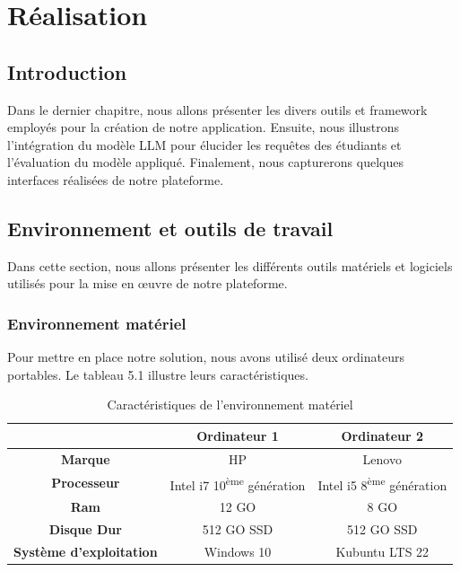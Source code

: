 \vfill 
\chapter{Réalisation}
\label{chap:conception}
\mtcaddchapter
\section*{Introduction}
\justifying
Dans le dernier chapitre, nous allons présenter les divers outils et framework employés pour la création de notre application. Ensuite, nous illustrons l'intégration  du modèle LLM pour élucider les requêtes des étudiants et l’évaluation du modèle appliqué. Finalement, nous capturerons  quelques interfaces réalisées de notre plateforme.

\section{Environnement et outils de travail}
\justifying
Dans cette section, nous allons présenter les différents outils matériels et logiciels utilisés pour la mise en œuvre de notre plateforme.
\subsection{Environnement matériel }
Pour mettre en place notre solution, nous avons utilisé deux ordinateurs portables. Le tableau 5.1 illustre leurs caractéristiques.
\begin{longtable}{|c|c|c|}
    \caption{Caractéristiques de l’environnement matériel} \\
    \hline
    & \textbf{Ordinateur 1} & \textbf{Ordinateur 2} \\
    \hline
    \textbf{Marque} & HP & Lenovo \\
    \hline
    \textbf{Processeur} & Intel i7 10\textsuperscript{ème} génération & Intel i5 8\textsuperscript{ème} génération \\
    \hline
    \textbf{Ram} & 12 GO & 8 GO \\
    \hline
    \textbf{Disque Dur} & 512 GO SSD & 512 GO SSD \\
    \hline
    \textbf{Système d’exploitation} & Windows 10 & Kubuntu LTS 22 \\
    \hline
\end{longtable}


